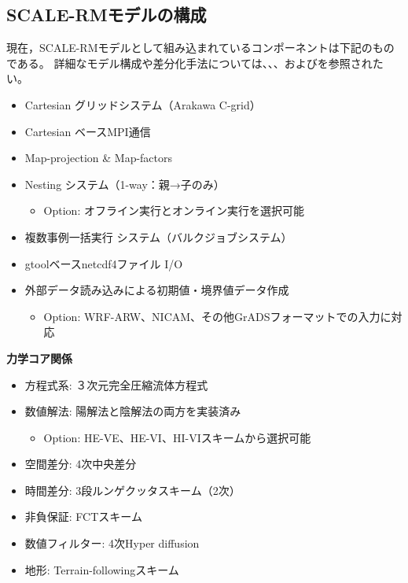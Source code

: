 \subsection{SCALE-RMモデルの構成}
現在，SCALE-RMモデルとして組み込まれているコンポーネントは下記のものである。
詳細なモデル構成や差分化手法については、\cite{scale_2015}、\cite{satoy_2015b}、および\cite{nishizawa_2015}を参照されたい。\\


\begin{itemize}
 \item Cartesian グリッドシステム（Arakawa C-grid）
 \item Cartesian ベースMPI通信
 \item Map-projection \& Map-factors
 \item Nesting システム（1-way：親→子のみ）
   \begin{itemize}
    \item Option: オフライン実行とオンライン実行を選択可能
   \end{itemize}
 \item 複数事例一括実行 システム（バルクジョブシステム）
 \item gtoolベースnetcdf4ファイル I/O
 \item 外部データ読み込みによる初期値・境界値データ作成
   \begin{itemize}
    \item Option: WRF-ARW、NICAM、その他GrADSフォーマットでの入力に対応
   \end{itemize}
\end{itemize}

{\bf 力学コア関係}

\begin{itemize}
 \item 方程式系: ３次元完全圧縮流体方程式
 \item 数値解法: 陽解法と陰解法の両方を実装済み
   \begin{itemize}
    \item Option: HE-VE、HE-VI、HI-VIスキームから選択可能
   \end{itemize}
 \item 空間差分: 4次中央差分
 \item 時間差分: 3段ルンゲクッタスキーム（2次）
 \item 非負保証: FCTスキーム
 \item 数値フィルター: 4次Hyper diffusion
 \item 地形: Terrain-followingスキーム
\end{itemize}

